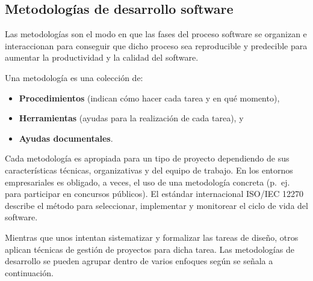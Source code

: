 \subsection{Metodologías de desarrollo software}
Las metodologías son el modo en que las fases del proceso software se organizan e interaccionan para conseguir que dicho proceso sea reproducible y predecible para aumentar la productividad y la calidad del software.

Una metodología es una colección de:

\begin{itemize}
\item \textbf{Procedimientos} (indican cómo hacer cada tarea y en qué momento),
\item \textbf{Herramientas} (ayudas para la realización de cada tarea), y
\item \textbf{Ayudas documentales}.
\end{itemize}

Cada metodología es apropiada para un tipo de proyecto dependiendo de sus 
características técnicas, organizativas y del equipo de trabajo. En los 
entornos empresariales es obligado, a veces, el uso de una metodología 
concreta (p.~ej. para participar en concursos públicos). El estándar 
internacional ISO/IEC 12270 describe el método para 
seleccionar, implementar y monitorear el ciclo de vida del software.

Mientras que unos intentan sistematizar y formalizar las tareas de diseño, otros aplican técnicas de gestión de proyectos para dicha tarea. Las metodologías de desarrollo se pueden agrupar dentro de varios enfoques según se señala a continuación.

